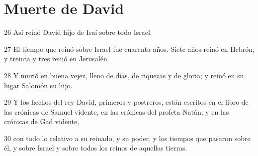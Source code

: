 \section*{Muerte de David}

\par 26 Así reinó David hijo de Isaí sobre todo Israel.
\par 27 El tiempo que reinó sobre Israel fue cuarenta años. Siete años reinó en Hebrón, y treinta y tres reinó en Jerusalén. 
\par 28 Y murió en buena vejez, lleno de días, de riquezas y de gloria; y reinó en su lugar Salomón su hijo.
\par 29 Y los hechos del rey David, primeros y postreros, están escritos en el libro de las crónicas de Samuel vidente, en las crónicas del profeta Natán, y en las crónicas de Gad vidente,
\par 30 con todo lo relativo a su reinado, y su poder, y los tiempos que pasaron sobre él, y sobre Israel y sobre todos los reinos de aquellas tierras.

